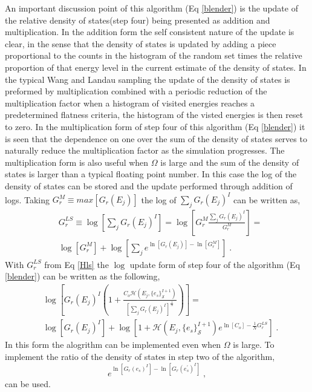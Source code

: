 \documentclass[aps,prl,reprint,superscriptaddress,showkeys]{revtex4-1}
\begin{document}
An important discussion point of this algorithm (Eq \ref{blender}) is the update of the relative density of states(step four) being presented as addition and multiplication. In the addition form the self consistent nature of the update is clear, in the sense that the  density of states is updated by adding a  piece proportional to the counts in the histogram of the random set times the relative proportion of  that energy level in the current estimate of the density of states.  In the typical Wang and Landau sampling the update of the density of states is preformed by multiplication combined with a periodic reduction of the multiplication factor when a histogram of visited energies reaches a predetermined flatness criteria, the histogram of the visted energies is then reset to zero. In the multiplication form of step four of this algorithm (Eq \ref{blender}) it is seen that the dependence on one over the sum of the density of states serves to naturally reduce the multiplication factor as the simulation progresses. The multiplication form is also useful when $\Omega$ is large and the sum of the density of states is larger than a typical floating point number. In this case the log of the density of states can be stored and the update performed through addition of logs. Taking $G_{r}^M \equiv  max[G_{r}(E_j)]$ the log of $\sum_j G_r(E_j)^{I}$ can be written as, 
\begin{equation}
\begin{split}
&G_{r}^{LS} \equiv \log[\sum_j G_{r}(E_j)^{I}] = \log[G_{r}^M \frac{\sum_j G_{r}(E_j)^{I}}{G_{r}^M}]=\\
&\log[G_{r}^M] + \log[\sum_j e^{\ln[G_{r}(E_j)] - \ln[G_{r}^M]} ] \;.
\end{split}
\label{Hls}
\end{equation} 
With $G_r^{LS}$ from Eq \ref{Hls} the $\log$ update form of step four of the algorithm (Eq \ref{blender}) can be written as the following, 
\begin{equation}
\begin{split}
& \log[ G_{r}(E_j)^{I}( 1 +  \frac{C_o \mathcal{H}(E_j,\{e_s\}_{\mathcal{S}}^{I+1}) }{ [\sum_j G_{r}(E_j)^{I}]^{\frac{1}{N} } } ) ]=\\
& \log[ G_{r}(E_j)^{I} ] + \log[1 +   \mathcal{H}(E_j,\{e_s\}_{\mathcal{S}}^{I+1})e^{\ln[C_o]-\frac{1}{N}G_{r}^{LS}}] \;.
\end{split}
\end{equation}
In this form  the alogrithm can be implemented even when $\Omega$ is large. To implement the ratio of the density of states in step two of the algorithm, 
\begin{equation}
e^{\ln[G_{r}(e_s)^{I}] - \ln[G_{r}(e_s^{'})^{I}]} \;,
\end{equation}
can be used.
\end{document}
